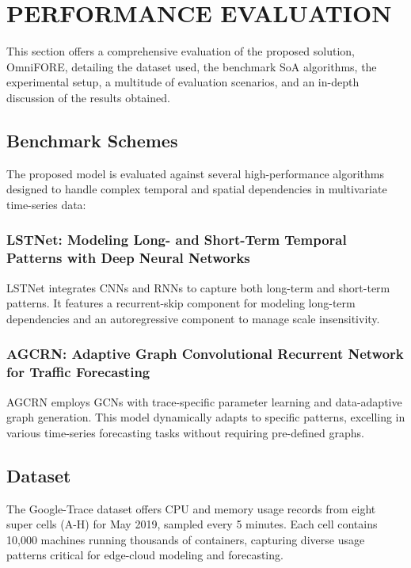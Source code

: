 \section{PERFORMANCE EVALUATION}
\label{sec: Performance Evaluation}

This section offers a comprehensive evaluation of the proposed solution, OmniFORE, detailing the dataset used, the benchmark SoA algorithms, the experimental setup, a multitude of evaluation scenarios, and an in-depth discussion of the results obtained.

\subsection{Benchmark Schemes}

The proposed model is evaluated against several high-performance algorithms designed to handle complex temporal and spatial dependencies in multivariate time-series data:

\subsubsection*{\textbf{LSTNet: Modeling Long- and Short-Term Temporal Patterns with Deep Neural Networks \cite{LSTNet}}}
LSTNet integrates CNNs and RNNs to capture both long-term and short-term patterns. It features a recurrent-skip component for modeling long-term dependencies and an autoregressive component to manage scale insensitivity.

\subsubsection*{\textbf{AGCRN: Adaptive Graph Convolutional Recurrent Network for Traffic Forecasting \cite{AGCRN}}}
AGCRN employs GCNs with trace-specific parameter learning and data-adaptive graph generation. This model dynamically adapts to specific patterns, excelling in various time-series forecasting tasks without requiring pre-defined graphs.


\subsection{Dataset}
\label{sec:Dataset}

The Google-Trace dataset \cite{google2019cluster} offers CPU and memory usage records from eight super cells (A-H) for May 2019, sampled every 5 minutes. Each cell contains 10,000 machines running thousands of containers, capturing diverse usage patterns critical for edge-cloud modeling and forecasting.

